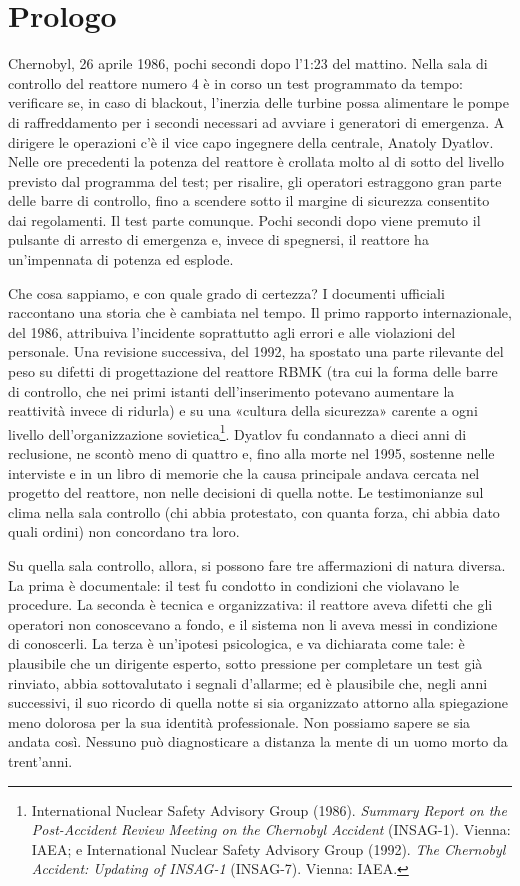 
\chapter*{Prologo}

Chernobyl, 26 aprile 1986, pochi secondi dopo l'1:23 del mattino. Nella sala di controllo del reattore numero 4 è in corso un test programmato da tempo: verificare se, in caso di blackout, l'inerzia delle turbine possa alimentare le pompe di raffreddamento per i secondi necessari ad avviare i generatori di emergenza. A dirigere le operazioni c'è il vice capo ingegnere della centrale, Anatoly Dyatlov. Nelle ore precedenti la potenza del reattore è crollata molto al di sotto del livello previsto dal programma del test; per risalire, gli operatori estraggono gran parte delle barre di controllo, fino a scendere sotto il margine di sicurezza consentito dai regolamenti. Il test parte comunque. Pochi secondi dopo viene premuto il pulsante di arresto di emergenza e, invece di spegnersi, il reattore ha un'impennata di potenza ed esplode.

Che cosa sappiamo, e con quale grado di certezza? I documenti ufficiali raccontano una storia che è cambiata nel tempo. Il primo rapporto internazionale, del 1986, attribuiva l'incidente soprattutto agli errori e alle violazioni del personale. Una revisione successiva, del 1992, ha spostato una parte rilevante del peso su difetti di progettazione del reattore RBMK (tra cui la forma delle barre di controllo, che nei primi istanti dell'inserimento potevano aumentare la reattività invece di ridurla) e su una «cultura della sicurezza» carente a ogni livello dell'organizzazione sovietica\footnote{International Nuclear Safety Advisory Group (1986). \textit{Summary Report on the Post-Accident Review Meeting on the Chernobyl Accident} (INSAG-1). Vienna: IAEA; e International Nuclear Safety Advisory Group (1992). \textit{The Chernobyl Accident: Updating of INSAG-1} (INSAG-7). Vienna: IAEA.}. Dyatlov fu condannato a dieci anni di reclusione, ne scontò meno di quattro e, fino alla morte nel 1995, sostenne nelle interviste e in un libro di memorie che la causa principale andava cercata nel progetto del reattore, non nelle decisioni di quella notte. Le testimonianze sul clima nella sala controllo (chi abbia protestato, con quanta forza, chi abbia dato quali ordini) non concordano tra loro.

Su quella sala controllo, allora, si possono fare tre affermazioni di natura diversa. La prima è documentale: il test fu condotto in condizioni che violavano le procedure. La seconda è tecnica e organizzativa: il reattore aveva difetti che gli operatori non conoscevano a fondo, e il sistema non li aveva messi in condizione di conoscerli. La terza è un'ipotesi psicologica, e va dichiarata come tale: è plausibile che un dirigente esperto, sotto pressione per completare un test già rinviato, abbia sottovalutato i segnali d'allarme; ed è plausibile che, negli anni successivi, il suo ricordo di quella notte si sia organizzato attorno alla spiegazione meno dolorosa per la sua identità professionale. Non possiamo sapere se sia andata così. Nessuno può diagnosticare a distanza la mente di un uomo morto da trent'anni.

